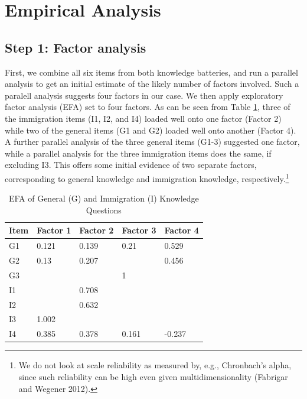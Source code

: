 \documentclass[12pt,halfline,a4paper,]{ouparticle}
\begin{document}
\hypertarget{empirical-analysis}{%
\section{Empirical Analysis}\label{empirical-analysis}}

\hypertarget{step-1-factor-analysis}{%
\subsection{Step 1: Factor analysis}\label{step-1-factor-analysis}}

First, we combine all six items from both knowledge batteries, and run a
parallel analysis to get an initial estimate of the likely number of
factors involved. Such a paralell analysis suggests four factors in our
case. We then apply exploratory factor analysis (EFA) set to four
factors. As can be seen from Table \ref{tab:tab2}, three of the
immigration items (I1, I2, and I4) loaded well onto one factor (Factor
2) while two of the general items (G1 and G2) loaded well onto another
(Factor 4). A further parallel analysis of the three general items
(G1-3) suggested one factor, while a parallel analysis for the three
immigration items does the same, if excluding I3. This offers some
initial evidence of two separate factors, corresponding to general
knowledge and immigration knowledge, respectively.\footnote{We do not
  look at scale reliability as measured by, e.g., Chronbach's alpha,
  since such reliability can be high even given multidimensionality
  (Fabrigar and Wegener 2012).}

\begin{table}

\caption{\label{tab:tab2}EFA of General (G) and Immigration (I) Knowledge Questions}
\centering
\begin{tabular}[t]{lllll}
\toprule
Item & Factor 1 & Factor 2 & Factor 3 & Factor 4\\
\midrule
G1 & 0.121 & 0.139 & 0.21 & 0.529\\
G2 & 0.13 & 0.207 &  & 0.456\\
G3 &  &  & 1 & \\
I1 &  & 0.708 &  & \\
I2 &  & 0.632 &  & \\
\addlinespace
I3 & 1.002 &  &  & \\
I4 & 0.385 & 0.378 & 0.161 & -0.237\\
\bottomrule
\end{tabular}
\end{table}
\end{document}
